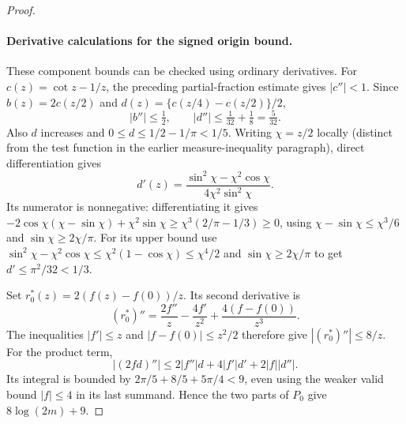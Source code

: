 \begin{proof}
\paragraph{Derivative calculations for the signed origin bound.}
These component bounds can be checked using ordinary derivatives.
For $c(z)=\cot z-1/z$, the preceding partial-fraction estimate gives
$|c''|<1$. Since $b(z)=2c(z/2)$ and
$d(z)=\{c(z/4)-c(z/2)\}/2$,
\[
 |b''|\leq\tfrac12,\qquad |d''|\leq\tfrac1{32}+\tfrac18=\tfrac5{32}.
\]
Also $d$ increases and $0\leq d\leq1/2-1/\pi<1/5$.
Writing $\chi=z/2$ locally (distinct from the test function in the earlier measure-inequality paragraph), direct differentiation gives
\[
 d'(z)=\frac{\sin^2\chi-\chi^2\cos \chi}{4\chi^2\sin^2\chi}.
\]
Its numerator is nonnegative: differentiating it gives
$-2\cos \chi(\chi-\sin \chi)+\chi^2\sin \chi\geq \chi^3(2/\pi-1/3)\geq0$,
using $\chi-\sin \chi\leq \chi^3/6$ and $\sin \chi\geq2\chi/\pi$.
For its upper bound use
$\sin^2\chi-\chi^2\cos \chi\leq \chi^2(1-\cos \chi)\leq \chi^4/2$ and
$\sin \chi\geq2\chi/\pi$ to get $d'\leq\pi^2/32<1/3$.

Set $r_0^*(z)=2(f(z)-f(0))/z$. Its second derivative is
\[
 (r_0^*)''=\frac{2f''}z-\frac{4f'}{z^2}
                            +\frac{4(f-f(0))}{z^3}.
\]
The inequalities $|f'|\leq z$ and $|f-f(0)|\leq z^2/2$
therefore give $|(r_0^*)''|\leq8/z$.
For the product term,
\[
 |(2fd)''|\leq2|f''|d+4|f'|d'+2|f||d''|.
\]
Its integral is bounded by
$2\pi/5+8/5+5\pi/4<9$, even using the weaker valid bound
$|f|\leq4$ in its last summand. Hence the two parts of $P_0$
give $8\log(2m)+9$.


\end{proof}
